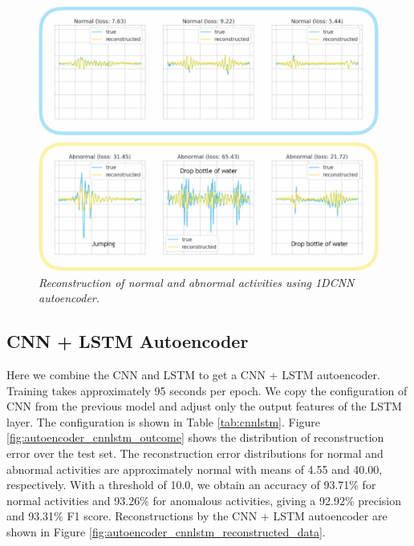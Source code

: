 \begin{figure}[H]
  \centering
  \caption[Reconstruction of normal and abnormal activities using 1DCNN autoencoder.]{\emph{Reconstruction of normal and abnormal activities using 1DCNN autoencoder.}} \label{fig:autoencoder_cnn_reconstructed_data}
  \includegraphics[scale = 0.22]{figures/autoencoder_cnn_reconstructed_data.jpg}
\end{figure}

\subsection{CNN + LSTM Autoencoder}
Here we combine the CNN and LSTM to get a CNN + LSTM autoencoder. Training takes approximately 95 seconds per epoch. We copy the configuration of CNN from the previous model and adjust only the output features of the LSTM layer. The configuration is shown in Table \ref{tab:cnnlstm}. Figure \ref{fig:autoencoder_cnnlstm_outcome} shows the distribution of reconstruction error over the test set. The reconstruction error distributions for normal and abnormal activities are approximately normal with means of 4.55 and 40.00, respectively. With a threshold of 10.0, we obtain an accuracy of 93.71$\%$ for normal activities and 93.26$\%$ for anomalous activities, giving a 92.92$\%$ precision and 93.31$\%$ F1 score. Reconstructions by the CNN + LSTM autoencoder are shown in Figure \ref{fig:autoencoder_cnnlstm_reconstructed_data}.


